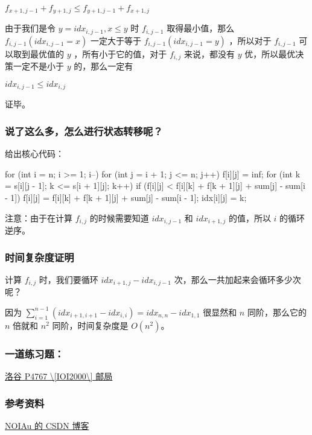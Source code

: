 $f_{x+1,j-1}+f_{y+1,j}\le f_{y+1,j-1}+f_{x+1,j}$

由于我们是令 $y=idx_{i,j-1},x\le y$ 时 $f_{i,j-1}$ 取得最小值，那么 $f_{i,j-1}(idx_{i,j-1}=x)$ 一定大于等于 $f_{i,j-1}(idx_{i,j-1}=y)$ ，所以对于 $f_{i,j-1}$ 可以取到最优值的 $y$ ，所有小于它的值，对于 $f_{i,j}$ 来说，都没有 $y$ 优，所以最优决策一定不是小于 $y$ 的，那么一定有 

$idx_{i,j-1}\le idx_{i,j}$ 

证毕。

\subsubsection{说了这么多，怎么进行状态转移呢？}

给出核心代码：

\begin{cppcode}
for (int i = n; i >= 1; i--) {
  for (int j = i + 1; j <= n; j++) {
    f[i][j] = inf;
    for (int k = s[i][j - 1]; k <= s[i + 1][j]; k++) {
      if (f[i][j] < f[i][k] + f[k + 1][j] + sum[j] - sum[i - 1]) {
        f[i][j] = f[i][k] + f[k + 1][j] + sum[j] - sum[i - 1];
        idx[i][j] = k;
      }
    }
  }
}
\end{cppcode}

注意：由于在计算 $f_{i,j}$ 的时候需要知道 $idx_{i,j-1}$ 和 $idx_{i+1,j}$ 的值，所以 $i$ 的循环逆序。

\subsubsection{时间复杂度证明}

计算 $f_{i,j}$ 时，我们要循环 $idx_{i+1,j}-idx_{i,j-1}$ 次，那么一共加起来会循环多少次呢？

因为 $\sum_{i=1}^{n-1}(idx_{i+1,i+1}-idx_{i,i})=idx_{n,n}-idx_{1,1}$ 很显然和 $n$ 同阶，那么它的 $n$ 倍就和 $n^2$ 同阶，时间复杂度是 $O(n^2)$。

\subsubsection{一道练习题：}

\href{https://www.luogu.org/problemnew/show/P4767}{洛谷 P4767 \textbackslash{}[IOI2000\textbackslash{}] 邮局}

\subsubsection{参考资料}

\href{https://blog.csdn.net/noiau/article/details/72514812}{NOIAu 的 CSDN 博客}

